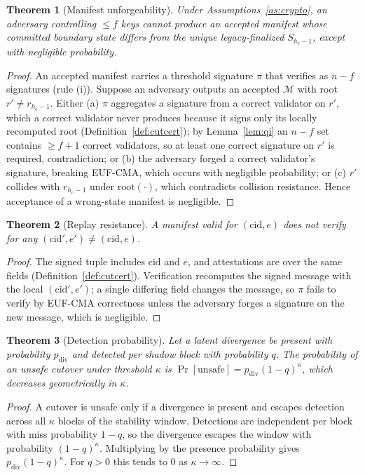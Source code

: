 \documentclass[journal]{IEEEtran}
\newtheorem{theorem}{Theorem}
\begin{document}
\begin{theorem}[Manifest unforgeability]
\label{th:unforge}
Under Assumptions~\ref{as:crypto}, an adversary controlling $\le f$ keys cannot produce an
accepted manifest whose committed boundary state differs from the unique legacy-finalized
$S_{h_{\mathrm{c}}-1}$, except with negligible probability.
\end{theorem}
\begin{proof}
An accepted manifest carries a threshold signature $\pi$ that verifies as $n-f$ signatures
(rule (i)). Suppose an adversary outputs an accepted $\mathcal{M}$ with root
$r'\ne r_{h_{\mathrm{c}}-1}$. Either (a) $\pi$ aggregates a signature from a correct validator on
$r'$, which a correct validator never produces because it signs only its locally recomputed root
(Definition~\ref{def:cutcert}); by Lemma~\ref{lem:qi} an $n-f$ set contains $\ge f+1$ correct
validators, so at least one correct signature on $r'$ is required, contradiction; or (b) the
adversary forged a correct validator's signature, breaking EUF-CMA, which occurs with negligible
probability; or (c) $r'$ collides with $r_{h_{\mathrm{c}}-1}$ under $\mathrm{root}(\cdot)$, which
contradicts collision resistance. Hence acceptance of a wrong-state manifest is negligible.
\end{proof}

\begin{theorem}[Replay resistance]
\label{th:replay}
A manifest valid for $(\mathrm{cid},e)$ does not verify for any $(\mathrm{cid}',e')\ne
(\mathrm{cid},e)$.
\end{theorem}
\begin{proof}
The signed tuple includes $\mathrm{cid}$ and $e$, and attestations are over the same fields
(Definition~\ref{def:cutcert}). Verification recomputes the signed message with the local
$(\mathrm{cid}',e')$; a single differing field changes the message, so $\pi$ fails to verify by
EUF-CMA correctness unless the adversary forges a signature on the new message, which is
negligible.
\end{proof}

\begin{theorem}[Detection probability]
\label{th:detection}
Let a latent divergence be present with probability $p_{\mathrm{div}}$ and detected per shadow
block with probability $q$. The probability of an unsafe cutover under threshold $\kappa$ is
$\Pr[\mathrm{unsafe}] = p_{\mathrm{div}}(1-q)^{\kappa}$, which decreases geometrically in
$\kappa$.
\end{theorem}
\begin{proof}
A cutover is unsafe only if a divergence is present and escapes detection across all $\kappa$
blocks of the stability window. Detections are independent per block with miss probability
$1-q$, so the divergence escapes the window with probability $(1-q)^{\kappa}$. Multiplying by the
presence probability gives $p_{\mathrm{div}}(1-q)^{\kappa}$. For $q>0$ this tends to $0$ as
$\kappa\to\infty$.
\end{proof}
\end{document}
